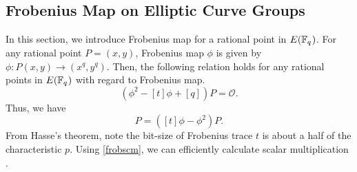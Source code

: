 \subsection{Frobenius Map on Elliptic Curve Groups}
In this section, we introduce Frobenius map for a rational point in $E({\mathbb{F}}_{q^{}})$.
For any rational point $P=(x, y)$, Frobenius map $\phi$ is given by $\phi:P(x, y) \rightarrow ({x}^q, {y}^q)$.
Then, the following relation holds for any rational points in $E({\mathbb{F}}_{q^{}})$ with regard to Frobenius map.
\begin{equation*}
\left(\phi^{2}-[t]\phi+[q]\right)P=\mathcal{O}.
\end{equation*}
Thus, we have
\begin{equation}
[q]P=\left([t]\phi-\phi^2\right)P. \label{frobscm}
\end{equation}
From Hasse's theorem, note the bit-size of Frobenius trace $t$ is about a half of the characteristic $p$. 
Using \eqref{frobscm}, we can efficiently calculate scalar multiplication \cite{C:Koblitz91}.
